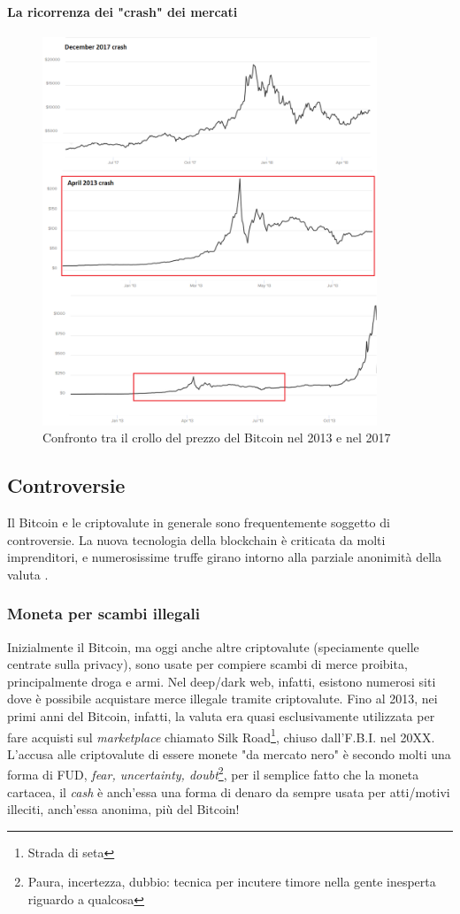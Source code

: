 \documentclass {article}
\begin{document}
\paragraph {La ricorrenza dei "crash" dei mercati}

\vspace {0.5cm}
\begin{figure}[htb!]
\includegraphics [width = 10cm] {crash2.png}
\centering
\caption {Confronto tra il crollo del prezzo del Bitcoin nel 2013 e nel 2017}
\end{figure}
\vspace {0.2cm}
\noindent
%

\subsection {Controversie}


Il Bitcoin e le criptovalute in generale sono frequentemente soggetto di controversie. La nuova tecnologia della blockchain è criticata da molti imprenditori, e numerosissime truffe girano intorno alla parziale anonimità della valuta \cite{controversy}.


\subsubsection {Moneta per scambi illegali}


Inizialmente il Bitcoin, ma oggi anche altre criptovalute (speciamente quelle centrate sulla privacy), sono usate per compiere scambi di merce proibita, principalmente droga e armi.
Nel deep/dark web, infatti, esistono numerosi siti dove è possibile acquistare merce illegale tramite criptovalute.
Fino al 2013, nei primi anni del Bitcoin, infatti, la valuta era quasi esclusivamente utilizzata per fare acquisti sul \textit{marketplace} chiamato Silk Road\footnote{Strada di seta}, chiuso dall'F.B.I. nel 20XX.
L'accusa alle criptovalute di essere monete "da mercato nero" è secondo molti una forma di FUD, \textit{fear, uncertainty, doubt}\footnote{Paura, incertezza, dubbio: tecnica per incutere timore nella gente inesperta riguardo a qualcosa}, per il semplice fatto che la moneta cartacea, il \textit{cash} è anch'essa una forma di denaro da sempre usata per atti/motivi illeciti, anch'essa anonima, più del Bitcoin! 
\end{document}
